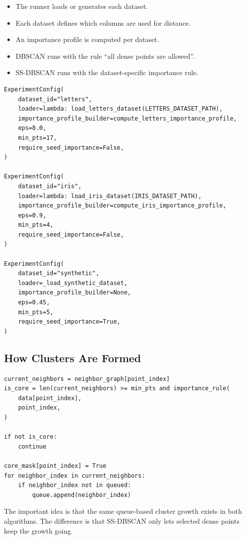 \documentclass[11pt,a4paper]{article}
\begin{document}
\begin{itemize}
\item The runner loads or generates each dataset.
\item Each dataset defines which columns are used for distance.
\item An importance profile is computed per dataset.
\item DBSCAN runs with the rule ``all dense points are allowed''.
\item SS-DBSCAN runs with the dataset-specific importance rule.
\end{itemize}

\begin{lstlisting}[style=pythonstyle,caption={Dataset configuration used by the three-experiment runner.}]
ExperimentConfig(
    dataset_id="letters",
    loader=lambda: load_letters_dataset(LETTERS_DATASET_PATH),
    importance_profile_builder=compute_letters_importance_profile,
    eps=8.0,
    min_pts=17,
    require_seed_importance=False,
)

ExperimentConfig(
    dataset_id="iris",
    loader=lambda: load_iris_dataset(IRIS_DATASET_PATH),
    importance_profile_builder=compute_iris_importance_profile,
    eps=0.9,
    min_pts=4,
    require_seed_importance=False,
)

ExperimentConfig(
    dataset_id="synthetic",
    loader=_load_synthetic_dataset,
    importance_profile_builder=None,
    eps=0.45,
    min_pts=5,
    require_seed_importance=True,
)
\end{lstlisting}

\subsection{How Clusters Are Formed}

\begin{lstlisting}[style=pythonstyle,caption={The expansion rule where SS-DBSCAN differs from baseline DBSCAN.}]
current_neighbors = neighbor_graph[point_index]
is_core = len(current_neighbors) >= min_pts and importance_rule(
    data[point_index],
    point_index,
)

if not is_core:
    continue

core_mask[point_index] = True
for neighbor_index in current_neighbors:
    if neighbor_index not in queued:
        queue.append(neighbor_index)
\end{lstlisting}

The important idea is that the same queue-based cluster growth exists in both
algorithms. The difference is that SS-DBSCAN only lets selected dense points
keep the growth going.
\end{document}
